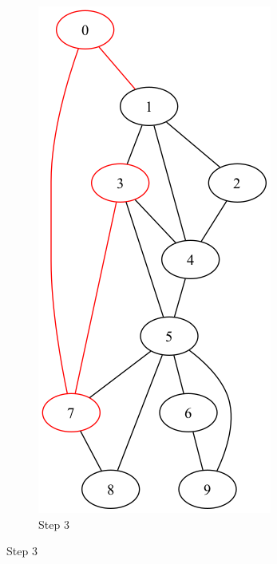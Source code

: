 \documentclass[a4paper,11pt]{report}
\begin{document}
\begin{figure}[htbp]
\begin{subfigure}[b]{0.3\textwidth}
        \includegraphics[height=0.29\textheight]{notebook/assets/aufgabe_07_fleury_step_2.png}
        \caption{Step 3}
        \label{fig:fleury_step_3}
    \end{subfigure}
    
    \vspace{1em}
    

\end{figure}
\end{document}
